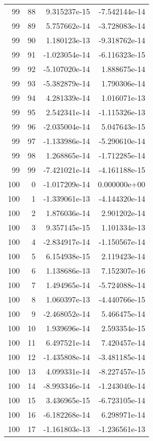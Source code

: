 \begin{tabular}{rrrr}
  99 &   88 &  9.315237e-15 & -7.542144e-14 \\
  99 &   89 &  5.757662e-14 & -3.728083e-14 \\
  99 &   90 &  1.180123e-13 & -9.318762e-14 \\
  99 &   91 & -1.023054e-14 & -6.116323e-15 \\
  99 &   92 & -5.107020e-14 &  1.888675e-14 \\
  99 &   93 & -5.382879e-14 &  1.790306e-14 \\
  99 &   94 &  4.281339e-14 &  1.016071e-13 \\
  99 &   95 &  2.542341e-14 & -1.115326e-13 \\
  99 &   96 & -2.035004e-14 &  5.047643e-15 \\
  99 &   97 & -1.133986e-14 & -5.290610e-14 \\
  99 &   98 &  1.268865e-14 & -1.712285e-14 \\
  99 &   99 & -7.421021e-14 & -4.161188e-15 \\
 100 &    0 & -1.017209e-14 &  0.000000e+00 \\
 100 &    1 & -1.339061e-13 & -4.144320e-14 \\
 100 &    2 &  1.876036e-14 &  2.901202e-14 \\
 100 &    3 &  9.357145e-15 &  1.101334e-13 \\
 100 &    4 & -2.834917e-14 & -1.150567e-14 \\
 100 &    5 &  6.154938e-15 &  2.119423e-14 \\
 100 &    6 &  1.138686e-13 &  7.152307e-16 \\
 100 &    7 &  1.494965e-14 & -5.724088e-14 \\
 100 &    8 &  1.060397e-13 & -4.440766e-15 \\
 100 &    9 & -2.468052e-14 &  5.466475e-14 \\
 100 &   10 &  1.939696e-14 &  2.593354e-15 \\
 100 &   11 &  6.497521e-14 &  7.420457e-14 \\
 100 &   12 & -1.435808e-14 & -3.481185e-14 \\
 100 &   13 &  4.099331e-14 & -8.227457e-15 \\
 100 &   14 & -8.993346e-14 & -1.243040e-14 \\
 100 &   15 &  3.436965e-15 & -6.723105e-14 \\
 100 &   16 & -6.182268e-14 &  6.298971e-14 \\
 100 &   17 & -1.161803e-13 & -1.236561e-13 \\

\end{tabular}
